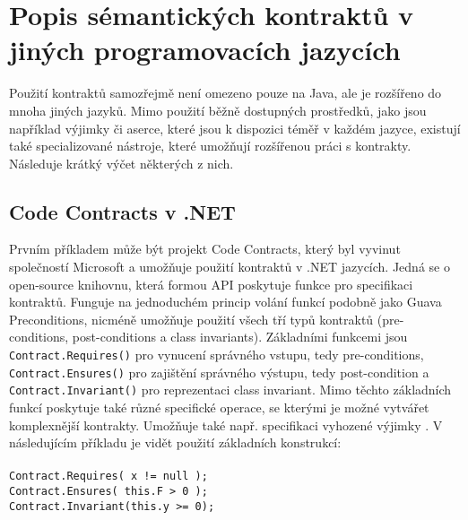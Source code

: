 	\section{Popis sémantických kontraktů v jiných programovacích jazycích}
		Použití kontraktů samozřejmě není omezeno pouze na Java, ale je rozšířeno do mnoha jiných jazyků. Mimo použití běžně dostupných prostředků, jako jsou například výjimky či aserce, které jsou k dispozici téměř v každém jazyce, existují také specializované nástroje, které umožňují rozšířenou práci s kontrakty. Následuje krátký výčet některých z nich.
		
		\subsection{Code Contracts v .NET}
			Prvním příkladem může být projekt Code Contracts, který byl vyvinut společností Microsoft a umožňuje použití kontraktů v .NET jazycích. Jedná se o open-source knihovnu, která formou API poskytuje funkce pro specifikaci kontraktů. Funguje na jednoduchém princip volání funkcí podobně jako Guava Preconditions, nicméně umožňuje použití všech tří typů kontraktů (pre-conditions, post-conditions a class invariants). Základními funkcemi jsou \texttt{Contract.Requires()} pro vynucení správného vstupu, tedy pre-conditions, \texttt{Contract.Ensures()} pro zajištění správného výstupu, tedy post-condition a \texttt{Contract.Invariant()} pro reprezentaci class invariant. Mimo těchto základních funkcí poskytuje také různé specifické operace, se kterými je možné vytvářet komplexnější kontrakty. Umožňuje také např. specifikaci vyhozené výjimky \cite{codeContracts}\cite{codeContracts2}. V následujícím příkladu je vidět použití základních konstrukcí:\\\\
			\- \- \- \- \- \texttt{Contract.Requires( x != null );}\\
			\- \- \- \- \- \texttt{Contract.Ensures( this.F > 0 );}\\
			\- \- \- \- \- \texttt{Contract.Invariant(this.y >= 0);}

			
